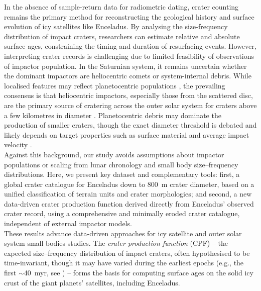 \documentclass[preprint,11pt,3p,times,authoryear]{elsarticle}
\begin{document}
In the absence of sample-return data for radiometric dating, crater counting remains the primary method for reconstructing the geological history and surface evolution of icy satellites like Enceladus. By analysing the size-frequency distribution of impact craters, researchers can estimate relative and absolute surface ages, constraining the timing and duration of resurfacing events. However, interpreting crater records is challenging due to limited feasibility of observations of impactor population.
In the Saturnian system, it remains uncertain whether the dominant impactors are heliocentric comets or system-internal debris. While localised features may reflect planetocentric populations \citep[e.g.][]{Cuk2016,Ferguson2022}, the prevailing consensus is that heliocentric impactors, especially those from the scattered disc, are the primary source of cratering across the outer solar system for craters above a few kilometres in diameter \citep{Shoemaker1982,Chapman1986,Zahnle1998,Hirata2016,Nesvorny2019,Wong2023,Nesvorny2023}. Planetocentric debris may dominate the production of smaller craters, though the exact diameter threshold is debated and likely depends on target properties such as surface material and average impact velocity \citep{Bell2020}.\\

Against this background, our study avoids assumptions about impactor populations or scaling from lunar chronology and small body size–frequency distributions. Here, we present key dataset and complementary tools: first, a global crater catalogue for Enceladus down to 800~m crater diameter, based on a unified classification of terrain units and crater morphologies; and second, a new data-driven crater production function derived directly from Enceladus’ observed crater record, using a comprehensive and minimally eroded crater catalogue, independent of external impactor models. \\

These results advance data-driven approaches for icy satellite and outer solar system small bodies studies. The \textit{crater production function} (CPF) -- the expected size–frequency distribution of impact craters, often hypothesised to be time-invariant, though it may have varied during the earliest epochs (e.g., the first $\sim$40~myr, see \citet{Bottke2023,Bottke2024})
-- forms the basis for computing surface ages on the solid icy crust of the giant planets' satellites, including Enceladus.
\end{document}
